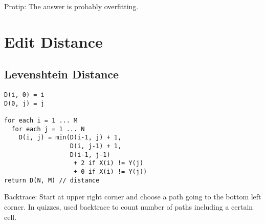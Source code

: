 \documentclass[10pt,twocolumn]{amsart}
\begin{document}
%
Protip: The answer is probably overfitting.
\section{Edit Distance}
\subsection{Levenshtein Distance}
\begin{verbatim}
D(i, 0) = i
D(0, j) = j

for each i = 1 ... M
  for each j = 1 ... N
    D(i, j) = min(D(i-1, j) + 1,
                  D(i, j-1) + 1,
                  D(i-1, j-1) 
                   + 2 if X(i) != Y(j)
                   + 0 if X(i) != Y(j))
return D(N, M) // distance
\end{verbatim}
Backtrace: Start at upper right corner and choose a path going to
the bottom left corner. In quizzes, used backtrace to count number of paths
including a certain cell.
\end{document}
